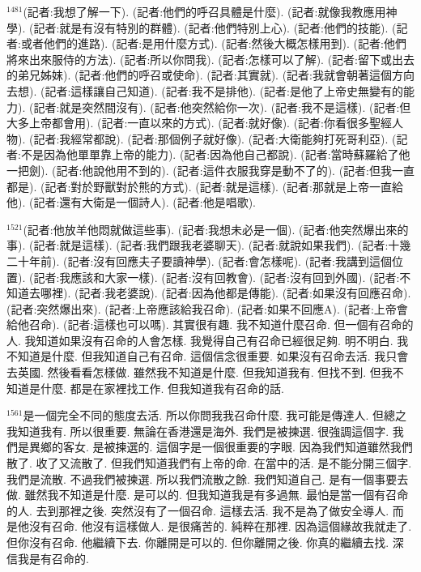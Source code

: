 \documentclass{book}
\begin{document}
$^{1481}$(記者:我想了解一下).
(記者:他們的呼召具體是什麼).
(記者:就像我教應用神學).
(記者:就是有沒有特別的群體).
(記者:他們特別上心).
(記者:他們的技能).
(記者:或者他們的進路).
(記者:是用什麼方式).
(記者:然後大概怎樣用到).
(記者:他們將來出來服侍的方法).
(記者:所以你問我).
(記者:怎樣可以了解).
(記者:留下或出去的弟兄姊妹).
(記者:他們的呼召或使命).
(記者:其實就).
(記者:我就會朝著這個方向去想).
(記者:這樣讓自己知道).
(記者:我不是排他).
(記者:是他了上帝史無變有的能力).
(記者:就是突然間沒有).
(記者:他突然給你一次).
(記者:我不是這樣).
(記者:但大多上帝都會用).
(記者:一直以來的方式).
(記者:就好像).
(記者:你看很多聖經人物).
(記者:我經常都說).
(記者:那個例子就好像).
(記者:大衛能夠打死哥利亞).
(記者:不是因為他單單靠上帝的能力).
(記者:因為他自己都說).
(記者:當時蘇羅給了他一把劍).
(記者:他說他用不到的).
(記者:這件衣服我穿是動不了的).
(記者:但我一直都是).
(記者:對於野獸對於熊的方式).
(記者:就是這樣).
(記者:那就是上帝一直給他).
(記者:還有大衛是一個詩人).
(記者:他是唱歌).

$^{1521}$(記者:他放羊他悶就做這些事).
(記者:我想未必是一個).
(記者:他突然爆出來的事).
(記者:就是這樣).
(記者:我們跟我老婆聊天).
(記者:就說如果我們).
(記者:十幾二十年前).
(記者:沒有回應夫子要讀神學).
(記者:會怎樣呢).
(記者:我講到這個位置).
(記者:我應該和大家一樣).
(記者:沒有回教會).
(記者:沒有回到外國).
(記者:不知道去哪裡).
(記者:我老婆說).
(記者:因為他都是傳能).
(記者:如果沒有回應召命).
(記者:突然爆出來).
(記者:上帝應該給我召命).
(記者:如果不回應A).
(記者:上帝會給他召命).
(記者:這樣也可以嗎).
其實很有趣.
我不知道什麼召命.
但一個有召命的人.
我知道如果沒有召命的人會怎樣.
我覺得自己有召命已經很足夠.
明不明白.
我不知道是什麼.
但我知道自己有召命.
這個信念很重要.
如果沒有召命去活.
我只會去英國.
然後看看怎樣做.
雖然我不知道是什麼.
但我知道我有.
但找不到.
但我不知道是什麼.
都是在家裡找工作.
但我知道我有召命的話.

$^{1561}$是一個完全不同的態度去活.
所以你問我我召命什麼.
我可能是傳達人.
但總之我知道我有.
所以很重要.
無論在香港還是海外.
我們是被揀選.
很強調這個字.
我們是異鄉的客女.
是被揀選的.
這個字是一個很重要的字眼.
因為我們知道雖然我們散了.
收了又流散了.
但我們知道我們有上帝的命.
在當中的活.
是不能分開三個字.
我們是流散.
不過我們被揀選.
所以我們流散之餘.
我們知道自己.
是有一個事要去做.
雖然我不知道是什麼.
是可以的.
但我知道我是有多過無.
最怕是當一個有召命的人.
去到那裡之後.
突然沒有了一個召命.
這樣去活.
我不是為了做安全導人.
而是他沒有召命.
他沒有這樣做人.
是很痛苦的.
純粹在那裡.
因為這個緣故我就走了.
但你沒有召命.
他繼續下去.
你離開是可以的.
但你離開之後.
你真的繼續去找.
深信我是有召命的.
\end{document}
